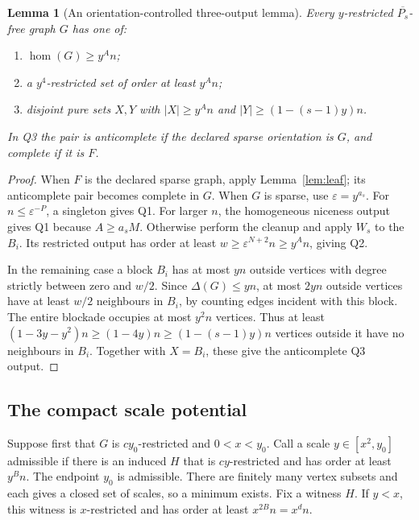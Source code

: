\documentclass[11pt,a4paper]{article}
\newtheorem{lemma}[theorem]{Lemma}
\theoremstyle{definition}
\theoremstyle{remark}
\numberwithin{equation}{section}
\begin{document}
\begin{lemma}[An orientation-controlled three-output lemma]\label{lem:three}
Every \(y\)-restricted \(\overline{P_s}\)-free graph \(G\) has one of:
\begin{enumerate}[label=(Q\arabic*)]
\item \(\hom(G)\ge y^A n\);
\item a \(y^4\)-restricted set of order at least \(y^A n\);
\item disjoint pure sets \(X,Y\) with \(|X|\ge y^A n\) and \(|Y|\ge(1-(s-1)y)n\).
\end{enumerate}
In Q3 the pair is anticomplete if the declared sparse orientation is \(G\), and complete if it is \(F\).
\end{lemma}
\begin{proof}
When \(F\) is the declared sparse graph, apply Lemma~\ref{lem:leaf}; its anticomplete pair becomes complete in \(G\). When \(G\) is sparse, use \(\varepsilon=y^{a_s}\). For \(n\le\varepsilon^{-P}\), a singleton gives Q1. For larger \(n\), the homogeneous niceness output gives Q1 because \(A\ge a_sM\). Otherwise perform the cleanup and apply \(W_s\) to the \(B_i\). Its restricted output has order at least \(w\ge\varepsilon^{N+2}n\ge y^A n\), giving Q2.

In the remaining case a block \(B_i\) has at most \(yn\) outside vertices with degree strictly between zero and \(w/2\). Since \(\Delta(G)\le yn\), at most \(2yn\) outside vertices have at least \(w/2\) neighbours in \(B_i\), by counting edges incident with this block. The entire blockade occupies at most \(y^2n\) vertices. Thus at least \((1-3y-y^2)n\ge(1-4y)n\ge(1-(s-1)y)n\) vertices outside it have no neighbours in \(B_i\). Together with \(X=B_i\), these give the anticomplete Q3 output.
\end{proof}

\subsection{The compact scale potential}
Suppose first that \(G\) is \(cy_0\)-restricted and \(0<x<y_0\). Call a scale \(y\in[x^2,y_0]\) admissible if there is an induced \(H\) that is \(cy\)-restricted and has order at least \(y^B n\). The endpoint \(y_0\) is admissible. There are finitely many vertex subsets and each gives a closed set of scales, so a minimum exists. Fix a witness \(H\). If \(y<x\), this witness is \(x\)-restricted and has order at least \(x^{2B}n=x^d n\).
\end{document}
